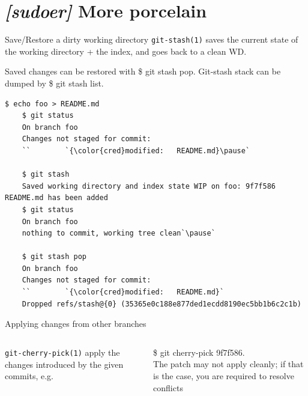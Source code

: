 \section{\emph{[sudoer]} More porcelain}

\begin{frame}[fragile]{Save/Restore a dirty working directory}
  \texttt{git-stash(1)} saves the current state of the working directory + the index, and goes back to a clean WD.

  Saved changes can be restored with {\ttfamily\scriptsize\$ git stash pop}. Git-stash stack can be dumped by {\ttfamily\scriptsize\$ git stash list}.
  \pause

  \begin{lstlisting}[style=bash]
    $ echo foo > README.md
    $ git status
    On branch foo
    Changes not staged for commit:
    ``        `{\color{cred}modified:   README.md}\pause`

    $ git stash
    Saved working directory and index state WIP on foo: 9f7f586 README.md has been added
    $ git status
    On branch foo
    nothing to commit, working tree clean`\pause`

    $ git stash pop
    On branch foo
    Changes not staged for commit:
    ``        `{\color{cred}modified:   README.md}`
    Dropped refs/stash@{0} (35365e0c188e877ded1ecdd8190ec5bb1b6c2c1b)
  \end{lstlisting}
\end{frame}

\begin{frame}{Applying changes from other branches}
  \begin{columns}
    \texttt{git-cherry-pick(1)} apply the changes introduced by the given commits, e.g.\par
    {\ttfamily\scriptsize\$ git cherry-pick 9f7f586}.\\[1em]
    The patch may not apply cleanly; if that is the case, you are required to resolve conflicts

    \centering
  \end{columns}
\end{frame}

